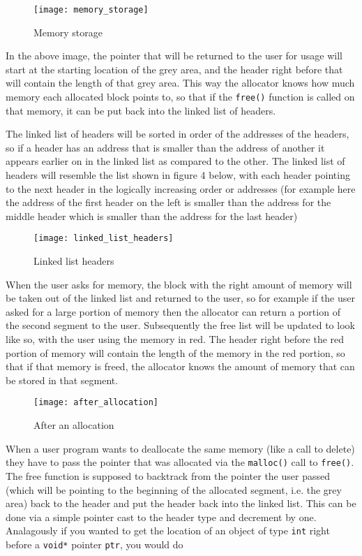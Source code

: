\documentclass{article}
\begin{document}
\begin{figure}[!htb]
\centering
\texttt{[image: memory\_storage]}
\caption{Memory storage}
\end{figure}

In the above image, the pointer that will be returned to the user for usage
will start at the starting location of the grey area, and the header right
before that will contain the length of that grey area.  This way the allocator
knows how much memory each allocated block points to, so that if the
\texttt{free()} function is called on that memory, it can be put back into the
linked list of headers.

The linked list of headers will be sorted in order of the addresses of the
headers, so if a header has an address that is smaller than the address of
another it appears earlier on in the linked list as compared to the other.
The linked list of headers will resemble the list shown in figure 4 below,
with each header pointing to the next header in the logically increasing order
or addresses (for example here the address of the first header on the left is
smaller than the address for the middle header which is smaller than the
address for the last header)

\begin{figure}[!htb]
\centering
\texttt{[image: linked\_list\_headers]}
\caption{Linked list headers}
\end{figure}

When the user asks for memory, the block with the right amount of memory will
be taken out of the linked list and returned to the user, so for example if
the user asked for a large portion of memory then the allocator can
return a portion of the second segment to the user.  Subsequently the free
list will be updated to look like so, with the user using the memory in red.
The header right before the red portion of memory will contain the length of
the memory in the red portion, so that if that memory is freed, the allocator
knows the amount of memory that can be stored in that segment.

\begin{figure}[!htb]
\centering
\texttt{[image: after\_allocation]}
\caption{After an allocation}
\end{figure}

When a user program wants to deallocate the same memory (like a call to
delete) they have to pass the pointer that was allocated via the
\texttt{malloc()} call to \texttt{free()}.  The free function is supposed to
backtrack from the pointer the user passed (which will be pointing to the
beginning of the allocated segment, i.e.  the grey area) back to the header
and put the header back into the linked list.  This can be done via a simple
pointer cast to the header type and decrement by one.  Analagously if you
wanted to get the location of an object of type \texttt{int} right before a
\texttt{void*} pointer \texttt{ptr}, you would do
\end{document}
